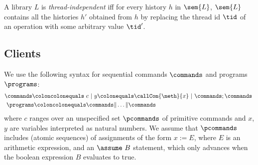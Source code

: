 \begin{definition}
A library $L$ is \emph{thread-independent} iff for every history $h$ in $\sem{L}$, $\sem{L}$ contains all the histories $h'$ obtained 
from $h$ by replacing the thread id $\tid$ of an operation with some arbitrary value $\tid'$.
\end{definition}

\subsection{Clients}

We use the following syntax for sequential commands 
$\commands$ and programs $\programs$:
\begin{align*}
\commands \coloncolonequals\ & c\ |\
y \colonequals \callCom{\meth}{x}\ |\ 
\commands; \commands\ %
\\
\programs \coloncolonequals & \commands \| \dots \| \commands
\end{align*}
where $c$ ranges over an unspecified set $\pcommands$ of primitive commands and $x$, $y$ are variables interpreted as natural numbers.
We assume that $\pcommands$ includes (atomic sequences) of assignments of the form $x:=E$, where $E$ is an arithmetic expression, 
and an $\assume\ B$ statement, which only advances when the boolean expression $B$ evaluates to true. %

